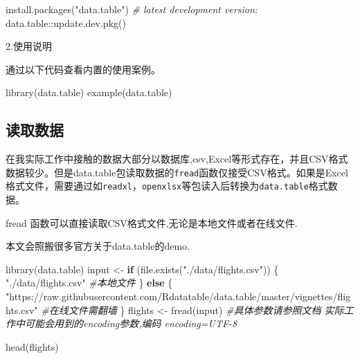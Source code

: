 \documentclass[
]{book}
\newenvironment{Shaded}{\begin{snugshade}}{\end{snugshade}}
\newcommand{\CommentTok}[1]{\textcolor[rgb]{0.56,0.35,0.01}{\textit{#1}}}
\newcommand{\ControlFlowTok}[1]{\textcolor[rgb]{0.13,0.29,0.53}{\textbf{#1}}}
\newcommand{\FunctionTok}[1]{\textcolor[rgb]{0.00,0.00,0.00}{#1}}
\newcommand{\NormalTok}[1]{#1}
\newcommand{\OtherTok}[1]{\textcolor[rgb]{0.56,0.35,0.01}{#1}}
\newcommand{\SpecialCharTok}[1]{\textcolor[rgb]{0.00,0.00,0.00}{#1}}
\newcommand{\StringTok}[1]{\textcolor[rgb]{0.31,0.60,0.02}{#1}}
\begin{document}
\begin{Shaded}
\begin{Highlighting}[]
\FunctionTok{install.packages}\NormalTok{(}\StringTok{"data.table"}\NormalTok{)}
\CommentTok{\# latest development version:}
\NormalTok{data.table}\SpecialCharTok{::}\FunctionTok{update.dev.pkg}\NormalTok{()}
\end{Highlighting}
\end{Shaded}

2.使用说明

通过以下代码查看内置的使用案例。

\begin{Shaded}
\begin{Highlighting}[]
\FunctionTok{library}\NormalTok{(data.table)}
\FunctionTok{example}\NormalTok{(data.table)}
\end{Highlighting}
\end{Shaded}

\hypertarget{ux8bfbux53d6ux6570ux636e}{%
\subsection{读取数据}\label{ux8bfbux53d6ux6570ux636e}}

在我实际工作中接触的数据大部分以数据库,csv,Excel等形式存在，并且CSV格式数据较少。但是data.table包读取数据的\texttt{fread}函数仅接受CSV格式。如果是Excel格式文件，需要通过如\texttt{readxl}，\texttt{openxlsx}等包读入后转换为\texttt{data.table}格式数据。

fread 函数可以直接读取CSV格式文件,无论是本地文件或者在线文件.

本文会照搬很多官方关于data.table的demo.

\begin{Shaded}
\begin{Highlighting}[]
\FunctionTok{library}\NormalTok{(data.table)}
\NormalTok{input }\OtherTok{\textless{}{-}} \ControlFlowTok{if}\NormalTok{ (}\FunctionTok{file.exists}\NormalTok{(}\StringTok{"./data/flights.csv"}\NormalTok{)) \{}
   \StringTok{"./data/flights.csv"} \CommentTok{\#本地文件}
\NormalTok{\} }\ControlFlowTok{else}\NormalTok{ \{}
  \StringTok{"https://raw.githubusercontent.com/Rdatatable/data.table/master/vignettes/flights.csv"} \CommentTok{\#在线文件需翻墙}
\NormalTok{\}}
\NormalTok{flights }\OtherTok{\textless{}{-}} \FunctionTok{fread}\NormalTok{(input) }\CommentTok{\#具体参数请参照文档  实际工作中可能会用到的encoding参数,编码 encoding=\textquotesingle{}UTF{-}8\textquotesingle{}}

\FunctionTok{head}\NormalTok{(flights)}
\end{Highlighting}
\end{Shaded}
\end{document}

